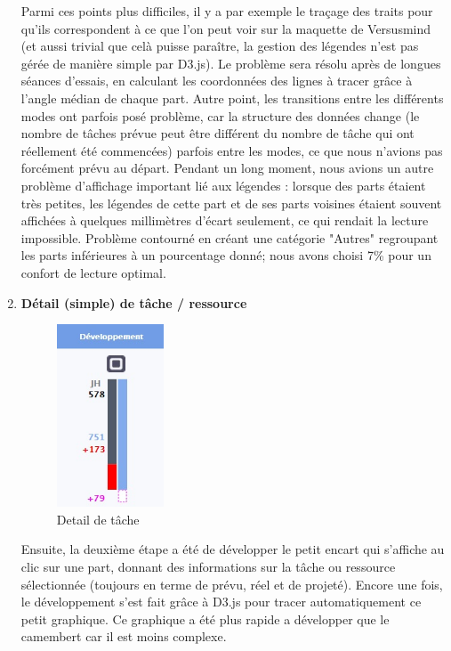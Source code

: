 \documentclass[12pt]{report}
\begin{document}
\begin{enumerate}
Parmi ces points plus difficiles, il y a par exemple le traçage des traits pour qu'ils correspondent à ce que l'on peut voir sur la maquette de Versusmind (et aussi trivial que celà puisse paraître, la gestion des légendes n'est pas gérée de manière simple par D3.js). Le problème sera résolu après de longues séances d'essais, en calculant les coordonnées des lignes à tracer grâce à l'angle médian de chaque part. 
Autre point, les transitions entre les différents modes ont parfois posé problème, car la structure des données change (le nombre de tâches prévue peut être différent du nombre de tâche qui ont réellement été commencées) parfois entre les modes, ce que nous n'avions pas forcément prévu au départ.
Pendant un long moment, nous avions un autre problème d'affichage important lié aux légendes : lorsque des parts étaient très petites, les légendes de cette part et de ses parts voisines étaient souvent affichées à quelques millimètres d'écart seulement, ce qui rendait la lecture impossible. Problème contourné en créant une catégorie "Autres" regroupant les parts inférieures à un pourcentage donné; nous avons choisi 7\% pour un confort de lecture optimal.\\


\item \textbf{Détail (simple) de tâche / ressource}\\

\begin{figure}[H]
	\centering
	\includegraphics[width=0.3\textwidth]{pictures/realisations/detailTache.jpg}
	\caption{Detail de tâche}
	\label{19}
\end{figure}

Ensuite, la deuxième étape a été de développer le petit encart qui s'affiche au clic sur une part, donnant des informations sur la tâche ou ressource sélectionnée (toujours en terme de prévu, réel et de projeté). Encore une fois, le développement s'est fait grâce à D3.js pour tracer automatiquement ce petit graphique. Ce graphique a été plus rapide a développer que le camembert car il est moins complexe.\\


\end{enumerate}
\end{document}
